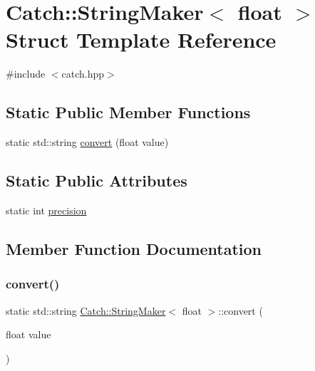 \hypertarget{struct_catch_1_1_string_maker_3_01float_01_4}{}\section{Catch\+::String\+Maker$<$ float $>$ Struct Template Reference}
\label{struct_catch_1_1_string_maker_3_01float_01_4}


{\ttfamily \#include $<$catch.\+hpp$>$}

\subsection*{Static Public Member Functions}
\begin{DoxyCompactItemize}
\item 
static std\+::string \mbox{\hyperlink{struct_catch_1_1_string_maker_3_01float_01_4_a7ffacc6fa46a338200f3fbb2ee078648}{convert}} (float value)
\end{DoxyCompactItemize}
\subsection*{Static Public Attributes}
\begin{DoxyCompactItemize}
\item 
static int \mbox{\hyperlink{struct_catch_1_1_string_maker_3_01float_01_4_a54ebebe76a755dbe2dd8ad409c329378}{precision}}
\end{DoxyCompactItemize}


\subsection{Member Function Documentation}
\mbox{\label{struct_catch_1_1_string_maker_3_01float_01_4_a7ffacc6fa46a338200f3fbb2ee078648}} 
\subsubsection{\texorpdfstring{convert()}{convert()}}
{\footnotesize\ttfamily static std\+::string \mbox{\hyperlink{struct_catch_1_1_string_maker}{Catch\+::\+String\+Maker}}$<$ float $>$\+::convert (\begin{DoxyParamCaption}\item[{float}]{value }\end{DoxyParamCaption})\hspace{0.3cm}{\ttfamily [static]}}



